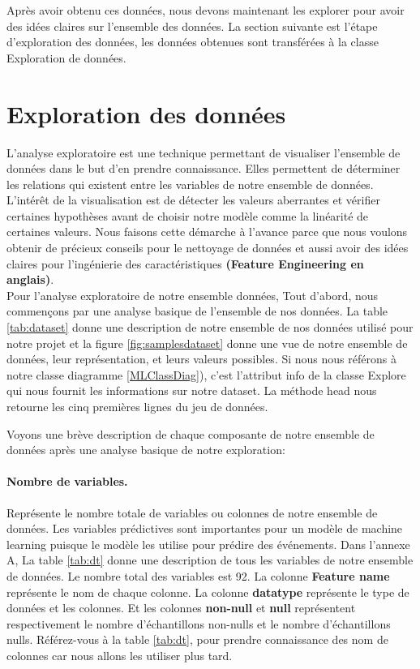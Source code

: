 \documentclass[12pt, french]{report}
\begin{document}
Après avoir obtenu ces données, nous devons maintenant les explorer pour avoir des idées claires sur l'ensemble des données. La section suivante est l'étape d'exploration des données, les données obtenues sont transférées à la classe Exploration de données. 

\section{Exploration des données}

L'analyse exploratoire est une technique permettant de visualiser l'ensemble de données dans le but d'en prendre connaissance. Elles permettent de déterminer les relations qui existent entre les variables de notre ensemble de données.  L'intérêt de la visualisation est de détecter les valeurs aberrantes et vérifier certaines hypothèses avant de choisir notre modèle comme la linéarité de certaines valeurs. Nous faisons cette démarche à l'avance parce que nous voulons obtenir de précieux conseils pour le nettoyage de données et aussi avoir des idées claires pour l'ingénierie des caractéristiques \textbf{(Feature Engineering en anglais)}.  \\

Pour l'analyse exploratoire de notre ensemble données, Tout d'abord, nous commençons par une analyse basique de l'ensemble de nos données. La table \ref{tab:dataset} donne une description de notre ensemble de nos données utilisé pour notre projet et la figure \ref{fig:samplesdataset} donne une vue de notre ensemble de données, leur représentation, et leurs valeurs possibles. Si nous nous référons à notre classe diagramme \ref{MLClassDiag}), c'est l'attribut info de la classe Explore qui nous fournit les informations sur notre dataset. La méthode head nous retourne les cinq premières lignes du jeu de données.

Voyons une brève description de chaque composante de notre ensemble de données après une analyse basique de notre exploration:

\paragraph*{Nombre de variables.} Représente le nombre totale de variables ou colonnes de notre ensemble de données. Les variables prédictives sont importantes pour un modèle de machine learning puisque le modèle les utilise pour prédire des événements. Dans l'annexe A, La table \ref{tab:dt} donne une description de tous les variables de notre ensemble de données. Le nombre total des variables est 92.  La colonne \textbf{Feature name} représente le nom de chaque colonne. La colonne \textbf{datatype} représente le type de données et les colonnes. Et les colonnes \textbf{non-null} et \textbf{null} représentent respectivement le nombre d'échantillons non-nulls et le nombre d'échantillons nulls. Référez-vous à la table \ref{tab:dt}, pour prendre connaissance des nom de colonnes car nous allons les utiliser plus tard. 
\end{document}
